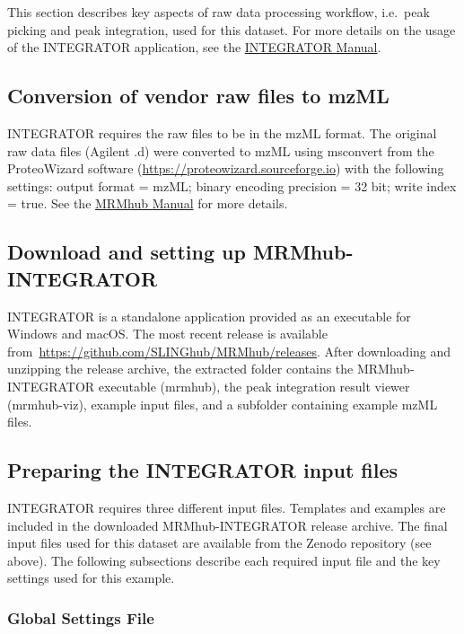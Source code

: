 \documentclass[
  letterpaper,
  DIV=11,
  numbers=noendperiod]{scrartcl}
\begin{document}
This section describes key aspects of raw data processing workflow,
i.e.~peak picking and peak integration, used for this dataset. For more
details on the usage of the INTEGRATOR application, see the
\hyperref[0]{INTEGRATOR Manual}.

\subsection{Conversion of vendor raw files to
mzML}\label{conversion-of-vendor-raw-files-to-mzml}

INTEGRATOR requires the raw files to be in the mzML format. The original
raw data files (Agilent .d) were converted to mzML using msconvert from
the ProteoWizard software
(\href{https://proteowizard.sourceforge.io/}{https://proteowizard.sourceforge.io})
with the following settings: output format = mzML; binary encoding
precision = 32 bit; write index = true. See the
\href{https://slinghub.github.io/MRMhub/articles/msconvert_manual.html}{MRMhub
Manual} for more details.

\subsection{Download and setting up
MRMhub-INTEGRATOR}\label{download-and-setting-up-mrmhub-integrator}

INTEGRATOR is a standalone application provided as an executable for
Windows and macOS. The most recent release is available
from~\url{https://github.com/SLINGhub/MRMhub/releases}. After
downloading and unzipping the release archive, the extracted folder
contains the MRMhub-INTEGRATOR executable (mrmhub), the peak integration
result viewer (mrmhub-viz), example input files, and a subfolder
containing example mzML files.

\subsection{Preparing the INTEGRATOR input
files}\label{preparing-the-integrator-input-files}

INTEGRATOR requires three different input files. Templates and examples
are included in the downloaded MRMhub-INTEGRATOR release archive. The
final input files used for this dataset are available from the Zenodo
repository (see above). The following subsections describe each required
input file and the key settings used for this example.

\subsubsection{Global Settings File}\label{global-settings-file}
\end{document}

